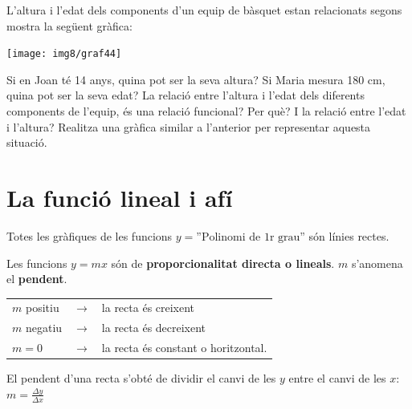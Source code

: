 \begin{mylist}



\exer  L'altura i l'edat dels components d'un equip de bàsquet estan relacionats segons mostra la següent gràfica:

\begin{minipage}{5cm}
	\texttt{[image: img8/graf44]}
\end{minipage}
\begin{minipage}{9cm}
	\begin{tasks}
		\task  Si en Joan té 14 anys, quina pot ser la seva altura? 
		\task  Si Maria mesura 180 cm, quina pot ser la seva edat? 
		\task  La relació entre l'altura i l'edat dels diferents components de l'equip, és una relació funcional? Per què?
		\task  I la relació entre l'edat i l'altura? Realitza una gràfica similar a l'anterior per representar aquesta situació.
	\end{tasks}
\end{minipage}
\end{mylist}


\section{La funció lineal i afí}
 

\begin{theorybox}
	

	
 Totes les gràfiques de les funcions $y=\text{''Polinomi de 1r grau''}$ són línies rectes.
 	
 Les funcions $y=mx$ són de \textbf{proporcionalitat directa o lineals}. \linebreak $m$ s'anomena el \textbf{pendent}.
 
 \begin{center}
 \begin{tabular}{lcl}
 	$m$ positiu & $\rightarrow$ & la recta és creixent \\
 	$m$ negatiu & $\rightarrow$  & la recta és decreixent \\
 	$m=0$ & $\rightarrow$  & la recta és constant o horitzontal.
 \end{tabular}
\end{center}

El pendent d'una recta s'obté de dividir el canvi de les $y$ entre el canvi de les $x$: $m=\frac{\Delta y}{\Delta x}$
 
\end{theorybox}

